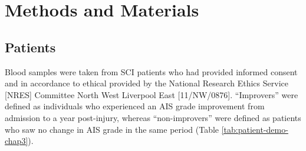 \documentclass[
]{article}
\begin{document}
\hypertarget{methods-and-materials-1}{%
\section{Methods and Materials}\label{methods-and-materials-1}}

\hypertarget{patients}{%
\subsection{Patients}\label{patients}}

Blood samples were taken from SCI patients who had provided informed consent and in accordance to ethical provided by the National Research Ethics Service {[}NRES{]} Committee North West Liverpool East {[}11/NW/0876{]}.
``Improvers'' were defined as individuals who experienced an AIS grade improvement from admission to a year post-injury, whereas ``non-improvers'' were defined as patients who saw no change in AIS grade in the same period (Table \ref{tab:patient-demo-chap3}).
\end{document}

